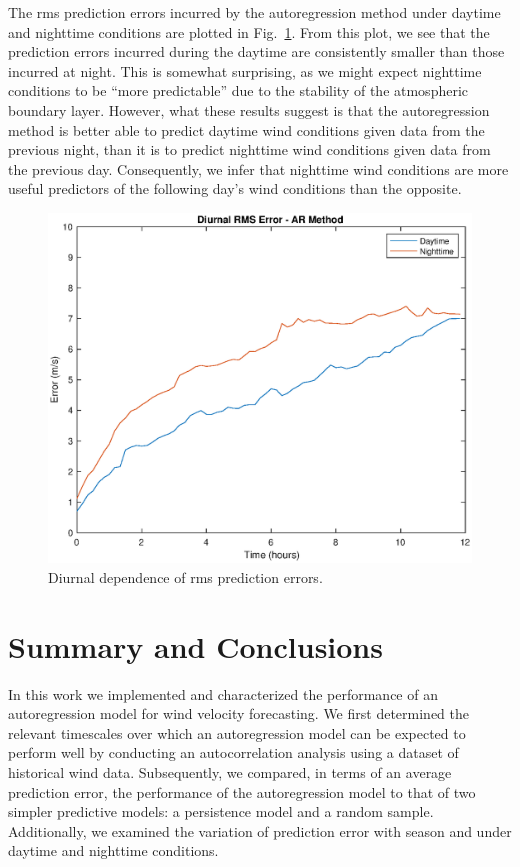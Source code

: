 \documentclass[11pt, oneside]{article}
\newcommand{\figref}[1]{Fig.~\ref{#1}}
\begin{document}
The rms prediction errors incurred by the autoregression method under daytime and nighttime conditions are plotted in \figref{fig:DiurnalRMS}.
From this plot, we see that the prediction errors incurred during the daytime are consistently smaller than those incurred at night.
This is somewhat surprising, as we might expect nighttime conditions to be ``more predictable'' due to the stability of the atmospheric boundary layer.
However, what these results suggest is that the autoregression method is better able to predict daytime wind conditions given data from the previous night, than it is to predict nighttime wind conditions given data from the previous day.
Consequently, we infer that nighttime wind conditions are more useful predictors of the following day's wind conditions than the opposite.

\begin{figure}[htb]
\centering
\includegraphics[width=\columnwidth]{figures/DiurnalRMSPredictionError}
\caption{Diurnal dependence of rms prediction errors.}
\label{fig:DiurnalRMS}
\end{figure}

\section{Summary and Conclusions}\label{sec:Conclusions}
In this work we implemented and characterized the performance of an autoregression model for wind velocity forecasting.
We first determined the relevant timescales over which an autoregression model can be expected to perform well by conducting an autocorrelation analysis using a dataset of historical wind data.
Subsequently, we compared, in terms of an average prediction error, the performance of the autoregression model to that of two simpler predictive models: a persistence model and a random sample.
Additionally, we examined the variation of prediction error with season and under daytime and nighttime conditions.
\end{document}
